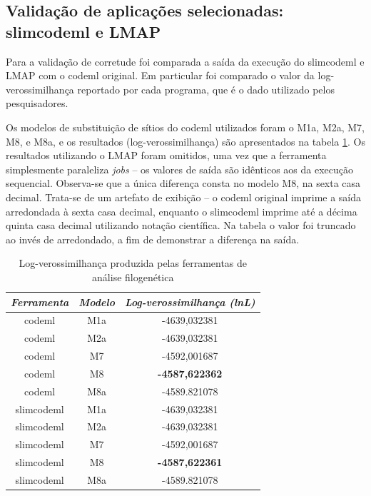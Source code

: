 \documentclass[cic,tc]{iiufrgs}
\begin{document}
\subsection{Validação de aplicações selecionadas: slimcodeml e LMAP}

Para a validação de corretude foi comparada a saída da execução do slimcodeml
e LMAP com o codeml original. Em particular foi comparado o valor da
log-verossimilhança reportado por cada programa, que é o dado utilizado pelos
pesquisadores.

Os modelos de substituição de sítios do codeml utilizados foram o M1a, M2a, M7,
M8, e M8a, e os resultados (log-verossimilhança) são apresentados na tabela
\ref{tbl:log}. Os resultados utilizando o LMAP foram omitidos, uma vez que a
ferramenta simplesmente paraleliza \textit{jobs} -- os valores de saída são
idênticos aos da execução sequencial. Observa-se que a única diferença consta
no modelo M8, na sexta casa decimal. Trata-se de um artefato de exibição -- o
codeml original imprime a saída arredondada à sexta casa decimal, enquanto o
slimcodeml imprime até a décima quinta casa decimal utilizando notação
científica. Na tabela o valor foi truncado ao invés de arredondado, a fim de
demonstrar a diferença na saída.

\begin{table}[h]
    \caption{Log-verossimilhança produzida pelas ferramentas de análise filogenética}
    \centering
        \begin{tabular}{c|c|c}
          \hline
          \textit{Ferramenta}  &   \textit{Modelo} & \textit{Log-verossimilhança (lnL)} \\
          \hline
          \hline
          codeml            & M1a & -4639,032381 \\
          codeml            & M2a & -4639,032381 \\
          codeml            & M7  & -4592,001687 \\
          codeml            & M8  & \textbf{-4587,622362} \\
          codeml            & M8a & -4589.821078 \\
          slimcodeml        & M1a & -4639,032381 \\
          slimcodeml        & M2a & -4639,032381 \\
          slimcodeml        & M7  & -4592,001687 \\
          slimcodeml        & M8  & \textbf{-4587,622361} \\
          slimcodeml        & M8a & -4589.821078 \\
          \hline
        \end{tabular}
    \label{tbl:log}
\end{table}
\end{document}
